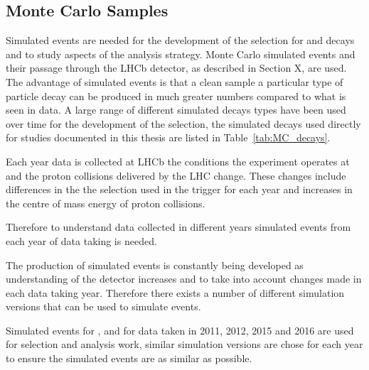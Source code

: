 \subsection{Monte Carlo Samples}
\label{sec:MCsamples}
Simulated events are needed for the development of the selection for \bsmumu and \bhh decays and to study aspects of the analysis strategy. Monte Carlo simulated events and their passage through the LHCb detector, as described in Section X, are used. The advantage of simulated events is that a clean sample a particular type of particle decay can be produced in much greater numbers compared to what is seen in data. A large range of different simulated decays types have been used over time for the development of the selection, the simulated decays used directly for studies documented in this thesis are listed in Table~\ref{tab:MC_decays}.

Each year data is collected at LHCb the conditions the experiment operates at and the proton collisions delivered by the LHC change. These changes include differences in the the selection used in the trigger for each year and increases in the centre of mass energy of proton collisions. 


Therefore to understand data collected in different years simulated events from each year of data taking is needed.

The production of simulated events is constantly being developed as understanding of the detector increases and to take into account changes made in each data taking year. Therefore there exists a number of different simulation versions that can be used to simulate events.

Simulated events for \bsmumu, \bskk and \bdkpi for data taken in 2011, 2012, 2015 and 2016 are used for selection and analysis work, similar simulation versions are chose for each year to ensure the simulated events are as similar as possible.


